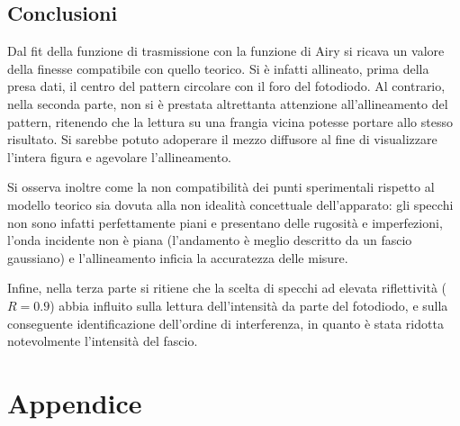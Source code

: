 \documentclass[10pt,oneside,a4paper]{article}
\begin{document}
\begin{multicols}{2}
\section{Conclusioni}
Dal fit della funzione di trasmissione con la funzione di Airy si ricava un valore della finesse compatibile con quello teorico. Si è infatti allineato, prima della presa dati, il centro del pattern circolare con il foro del fotodiodo. Al contrario, nella seconda parte, non si è prestata altrettanta attenzione all'allineamento del pattern, ritenendo che la lettura su una frangia vicina potesse portare allo stesso risultato. Si sarebbe potuto adoperare il mezzo diffusore al fine di visualizzare l'intera figura e agevolare l'allineamento.

Si osserva inoltre come la non compatibilità dei punti sperimentali rispetto al modello teorico sia dovuta alla non idealità concettuale dell'apparato: gli specchi non sono infatti perfettamente piani e presentano delle rugosità e imperfezioni, l'onda incidente non è piana (l'andamento è meglio descritto da un fascio gaussiano) e l'allineamento inficia la accuratezza delle misure.

Infine, nella terza parte si ritiene che la scelta di specchi ad elevata riflettività ($R=0.9$) abbia influito sulla lettura dell'intensità da parte del fotodiodo, e sulla conseguente identificazione dell'ordine di interferenza, in quanto è stata ridotta notevolmente l'intensità del fascio.

\end{multicols}


\newpage
\section{Appendice}
\end{document}
